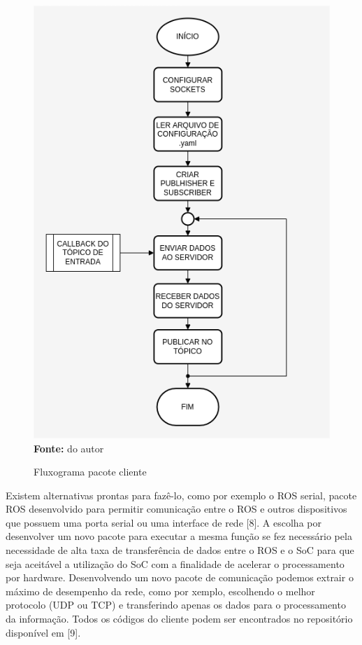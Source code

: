 \begin{figure}[ht]
	\caption{Fluxograma pacote cliente}
	\begin{center}
		\includegraphics[scale=0.47]{imagens/fluxogramaCliente.png}\\
		{\small \textbf{Fonte:} do autor}
    \end{center}
    \label{fig:clientfluxo}
\end{figure}

Existem alternativas prontas para fazê-lo, como por exemplo o ROS serial, pacote ROS desenvolvido para permitir comunicação entre o ROS e outros dispositivos que possuem uma porta serial ou uma interface de rede [8]. A escolha por desenvolver um novo pacote para executar a mesma função se fez necessário pela necessidade de alta taxa de transferência de dados entre o ROS e o SoC para que seja aceitável a utilização do SoC com a finalidade de acelerar o processamento por hardware. Desenvolvendo um novo pacote de comunicação podemos extrair o máximo de desempenho da rede, como por  xemplo, escolhendo o melhor protocolo (UDP ou TCP) e transferindo apenas os dados para o processamento da informação. Todos os códigos do cliente podem ser encontrados no repositório disponível em [9].
